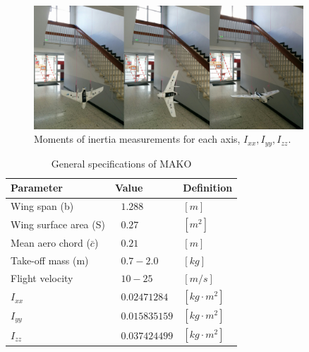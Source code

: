  \begin{figure}
      \centering
      \includegraphics[width=0.9\textwidth]{figures/Mako_Inertia_combined_small.png}
      \caption{Moments of inertia measurements for each axis, $I_{xx} , I_{yy} , I_{zz} $.}
      \label{fig:inertia}
 \end{figure}
 
 \begin{table}
\caption{General specifications of MAKO \cite{bronz2016aerodynamic}}
\label{arm:MAKOspecs}
\begin{center}
\begin{tabular}{ ||p{4cm}|p{3cm}|p{2cm}||}\hline
\textbf{Parameter} & \textbf{Value} & \textbf{Definition} \\\hline
Wing span (b)                  & $\ \ \, 1.288 $	   & $[m]$ \\\hline
Wing surface area (S)      & $ \ \ \, 0.27 $           &  $[m^2]$ \\\hline
Mean aero chord ($\bar{c}$)         & $\ \ \, 0.21$           & $[m]$ \\\hline
Take-off mass (m)             & $\ \ \, 0.7 - 2.0$       & $[kg]$ \\\hline
Flight velocity           & $\ \ \, 10 - 25$       & $[m/s]$ \\\hline
$I_{xx}$                         & $\ \ \, 0.02471284$   & $[kg \cdot m^2]$ \\\hline
$I_{yy}$                         & $\ \ \, 0.015835159$   & $[kg \cdot m^2]$ \\\hline
$I_{zz}$                         & $\ \ \, 0.037424499$   & $[kg \cdot m^2]$ \\\hline
\end{tabular}
\end{center}
\end{table}

